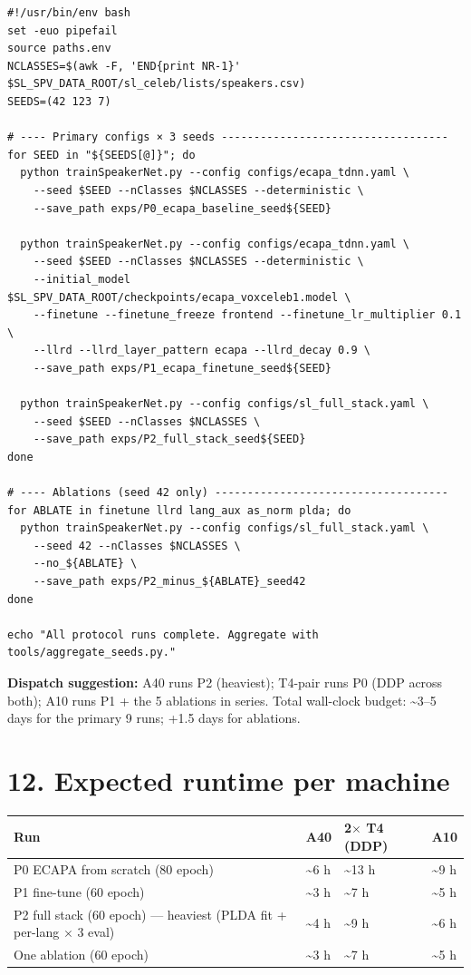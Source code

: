 \documentclass[10pt,a4paper]{article}
\renewcommand{\arraystretch}{1.15}
\begin{document}
\begin{Verbatim}[fontsize=\small,frame=single,framesep=4pt]
#!/usr/bin/env bash
set -euo pipefail
source paths.env
NCLASSES=$(awk -F, 'END{print NR-1}' $SL_SPV_DATA_ROOT/sl_celeb/lists/speakers.csv)
SEEDS=(42 123 7)

# ---- Primary configs × 3 seeds -----------------------------------
for SEED in "${SEEDS[@]}"; do
  python trainSpeakerNet.py --config configs/ecapa_tdnn.yaml \
    --seed $SEED --nClasses $NCLASSES --deterministic \
    --save_path exps/P0_ecapa_baseline_seed${SEED}

  python trainSpeakerNet.py --config configs/ecapa_tdnn.yaml \
    --seed $SEED --nClasses $NCLASSES --deterministic \
    --initial_model $SL_SPV_DATA_ROOT/checkpoints/ecapa_voxceleb1.model \
    --finetune --finetune_freeze frontend --finetune_lr_multiplier 0.1 \
    --llrd --llrd_layer_pattern ecapa --llrd_decay 0.9 \
    --save_path exps/P1_ecapa_finetune_seed${SEED}

  python trainSpeakerNet.py --config configs/sl_full_stack.yaml \
    --seed $SEED --nClasses $NCLASSES \
    --save_path exps/P2_full_stack_seed${SEED}
done

# ---- Ablations (seed 42 only) ------------------------------------
for ABLATE in finetune llrd lang_aux as_norm plda; do
  python trainSpeakerNet.py --config configs/sl_full_stack.yaml \
    --seed 42 --nClasses $NCLASSES \
    --no_${ABLATE} \
    --save_path exps/P2_minus_${ABLATE}_seed42
done

echo "All protocol runs complete. Aggregate with tools/aggregate_seeds.py."
\end{Verbatim}


\textbf{Dispatch suggestion:} A40 runs P2 (heaviest); T4-pair runs P0 (DDP across both); A10 runs P1 + the 5 ablations in series. Total wall-clock budget: \textasciitilde{}3--5 days for the primary 9 runs; +1.5 days for ablations.

\section*{12. Expected runtime per machine}

\begin{center}
\small
\renewcommand{\arraystretch}{1.25}
\begin{tabularx}{\textwidth}{|Y|Y|Y|Y|}
\hline
Run & A40 & 2$\times$ T4 (DDP) & A10 \\
\hline
P0 ECAPA from scratch (80 epoch) & \textasciitilde{}6 h & \textasciitilde{}13 h & \textasciitilde{}9 h \\
\hline
P1 fine-tune (60 epoch) & \textasciitilde{}3 h & \textasciitilde{}7 h & \textasciitilde{}5 h \\
\hline
P2 full stack (60 epoch) --- heaviest (PLDA fit + per-lang $\times$ 3 eval) & \textasciitilde{}4 h & \textasciitilde{}9 h & \textasciitilde{}6 h \\
\hline
One ablation (60 epoch) & \textasciitilde{}3 h & \textasciitilde{}7 h & \textasciitilde{}5 h \\
\hline
\end{tabularx}
\end{center}
\end{document}
